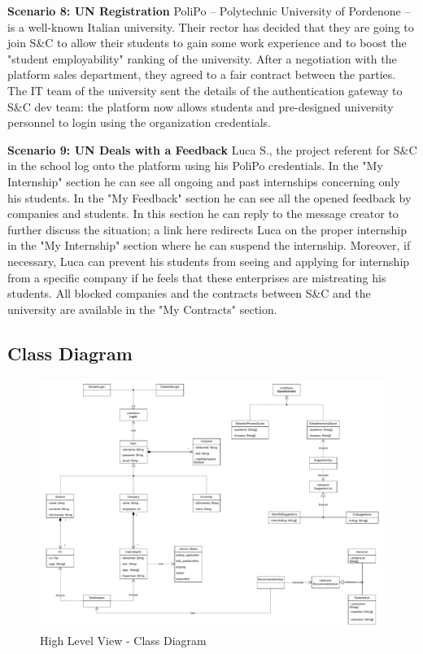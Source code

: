 \par{\textbf{Scenario 8: UN Registration}} PoliPo – Polytechnic University of Pordenone – is a well-known Italian
university. Their rector has decided that they are going to join S\&C to allow their students to gain some work
experience and to boost the "student employability" ranking of the university. After a negotiation with the platform
sales department, they agreed to a fair contract between the parties. The IT team of the university sent the details of
the authentication gateway to S\&C dev team: the platform now allows students and pre-designed university personnel to
login using the organization credentials.

\par{\textbf{Scenario 9: UN Deals with a Feedback}} Luca S., the project referent for S\&C in the school log onto the
platform using his PoliPo credentials. In the "My Internship" section he can see all ongoing and past internships
concerning only his students. In the "My Feedback" section he can see all the opened feedback by companies and
students. In this section he can reply to the message creator to further discuss the situation; a link here redirects
Luca on the proper internship in the "My Internship" section where he can suspend the internship.
Moreover, if necessary, Luca can prevent his students from seeing and applying for internship from a specific company
if he feels that these enterprises are mistreating his students. All blocked companies and the contracts between S\&C
and the university are available in the "My Contracts" section.

\subsection{Class Diagram}
\label{sub:class_diagram}%

\begin{figure}[H]
      \centering
      \includegraphics[width=1.0\textwidth]{Images/UML.pdf}
      \caption{High Level View - Class Diagram}
      \label{fig:class_diagram}
\end{figure}

